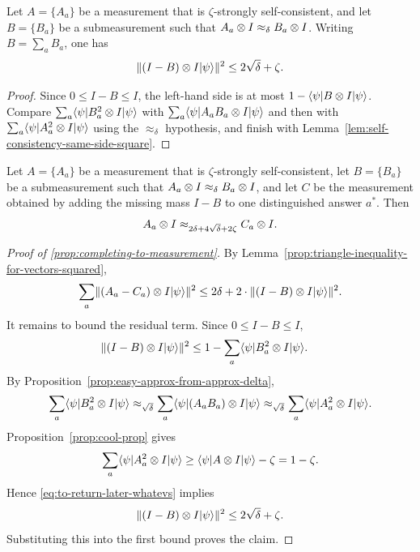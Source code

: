 \begin{lemma}\label{lem:completion-missing-mass-bound}
	\leanok
	Let $A=\{A_a\}$ be a measurement that is $\zeta$-strongly self-consistent, and let $B=\{B_a\}$ be a submeasurement such that $A_a \otimes I \approx_\delta B_a \otimes I$. Writing $B=\sum_a B_a$, one has
	\[
		\lVert (I-B) \otimes I\lvert \psi \rangle \rVert^2 \le 2\sqrt\delta + \zeta.
	\]
\end{lemma}
\begin{proof}
	\leanok
	Since $0 \le I-B \le I$, the left-hand side is at most $1-\langle \psi \rvert B \otimes I \lvert \psi \rangle$. Compare $\sum_a \langle \psi \rvert B_a^2 \otimes I \lvert \psi \rangle$ with $\sum_a \langle \psi \rvert A_a B_a \otimes I \lvert \psi \rangle$ and then with $\sum_a \langle \psi \rvert A_a^2 \otimes I \lvert \psi \rangle$ using the $\approx_\delta$ hypothesis, and finish with Lemma~\ref{lem:self-consistency-same-side-square}.
\end{proof}

\begin{lemma}\label{prop:completing-to-measurement}
	\leanok
	Let $A=\{A_a\}$ be a measurement that is $\zeta$-strongly self-consistent, let $B=\{B_a\}$ be a submeasurement such that $A_a \otimes I \approx_\delta B_a \otimes I$, and let $C$ be the measurement obtained by adding the missing mass $I-B$ to one distinguished answer $a^*$. Then
	\[
		A_a \otimes I \approx_{2\delta + 4\sqrt\delta + 2\zeta} C_a \otimes I.
	\]
\end{lemma}
\begin{proof}[Proof of \ref{prop:completing-to-measurement}]
	\leanok
	By Lemma~\ref{prop:triangle-inequality-for-vectors-squared},
	\[
		\sum_a \lVert(A_a-C_a)\otimes I \lvert \psi \rangle \rVert^2
		\leq 2\delta + 2 \cdot \lVert(I-B)\otimes I \lvert \psi \rangle\rVert^2.
	\]
	It remains to bound the residual term. Since $0 \le I-B \le I$,
	\begin{align}
		\lVert(I-B) \otimes I \lvert \psi \rangle\rVert^2
		 & \leq 1 -\sum_a \langle \psi \rvert B_a^2 \otimes I \lvert \psi \rangle.
		\label{eq:to-return-later-whatevs}
	\end{align}
	By Proposition~\ref{prop:easy-approx-from-approx-delta},
	\[
		\sum_a \langle \psi \rvert B_a^2 \otimes I \lvert \psi \rangle
		\approx_{\sqrt{\delta}} \sum_a \langle \psi \rvert (A_a B_a)\otimes I \lvert \psi \rangle
		\approx_{\sqrt{\delta}} \sum_a \langle \psi \rvert A_a^2\otimes I \lvert \psi \rangle.
	\]
	Proposition~\ref{prop:cool-prop} gives
	\[
		\sum_a \langle \psi \rvert A_a^2\otimes I \lvert \psi \rangle \geq \langle \psi \rvert A \otimes I \lvert \psi \rangle - \zeta = 1-\zeta.
	\]
	Hence \eqref{eq:to-return-later-whatevs} implies
	\[
		\lVert(I-B) \otimes I \lvert \psi \rangle\rVert^2 \le 2\sqrt\delta + \zeta.
	\]
	Substituting this into the first bound proves the claim.
\end{proof}

